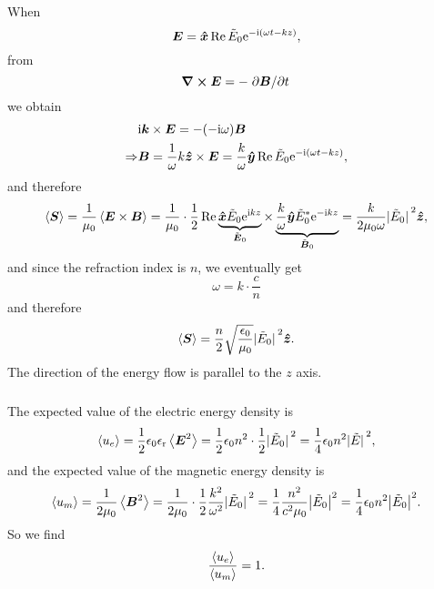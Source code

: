 \documentclass[hyperref, a4paper]{article}
\newcommand*{\ii}{\mathrm{i}}
\newcommand*{\ee}{\mathrm{e}}
\newcommand{\epsr}{\epsilon_{\text{r}}}
\newcommand{\Efreq}{\tilde{\vb*{E}}}
\begin{document}
When 
\begin{equation}
    \vb*{E} = \vu*{x} \Re \tilde{E}_0 \ee^{- \ii (\omega t - k z)},
\end{equation}
from 
\begin{equation}
    \curl{\vb*{E}} = - \pdv*{\vb*{B}}{t}
\end{equation}
we obtain 
\begin{equation}
    \begin{aligned}
        &\ii \vb*{k} \times \vb*{E} = - (- \ii \omega) \vb*{B}  \\
        \Rightarrow& \vb*{B} = \frac{1}{\omega} k \vu*{z} \times \vb*{E}
        = \frac{k}{\omega} \vu*{y} \Re \tilde{E}_0 \ee^{- \ii (\omega t - k z)},
    \end{aligned}
\end{equation}
and therefore 
\begin{equation}
    \expval{\vb*{S}} = \frac{1}{\mu_0} \expval{\vb*{E} \times \vb*{B}}
    = \frac{1}{\mu_0}  \cdot \frac{1}{2} \Re 
    \underbrace{\vu*{x} \tilde{E}_0 \ee^{\ii k z}}_{\Efreq_0} \times 
    \underbrace{\frac{k}{\omega} \vu*{y} \tilde{E}_0^* \ee^{- \ii k z}}_{\tilde{\vb*{B}}_0}
    = \frac{k}{2 \mu_0 \omega} \abs*{\tilde{E}_0}^2 \vu*{z},
\end{equation}
and since the refraction index is $n$, 
we eventually get 
\begin{equation}
    \omega = k \cdot \frac{c}{n}
\end{equation}
and therefore 
\begin{equation}
    \expval{\vb*{S}} = \frac{n}{2} \sqrt{\frac{\epsilon_0}{\mu_0}} \abs*{\tilde{E}_0}^2 \vu*{z}.
\end{equation}
The direction of the energy flow is parallel to the $z$ axis.

\subsubsection{}

The expected value of the electric energy density is 
\begin{equation}
    \expval{u_e} = \frac{1}{2} \epsilon_0 \epsr \expval{\vb*{E}^2}
    = \frac{1}{2} \epsilon_0 n^2 \cdot \frac{1}{2} \abs*{\tilde{E}_0}^2 
    = \frac{1}{4} \epsilon_0 n^2 \abs*{\tilde{E}}^2,
\end{equation}
and the expected value of the magnetic energy density is 
\begin{equation}
    \expval{u_m} = \frac{1}{2 \mu_0} \expval{\vb*{B}^2} 
    = \frac{1}{2 \mu_0} \cdot \frac{1}{2} \frac{k^2}{\omega^2} \abs*{\tilde{E}_0}^2 
    = \frac{1}{4} \frac{n^2}{c^2 \mu_0} \abs{\tilde{E}_0}^2 
    = \frac{1}{4} \epsilon_0 n^2 \abs{\tilde{E}_0}^2.
\end{equation}
So we find 
\begin{equation}
    \frac{\expval{u_e}}{\expval{u_m}} = 1.
\end{equation}
\end{document}
